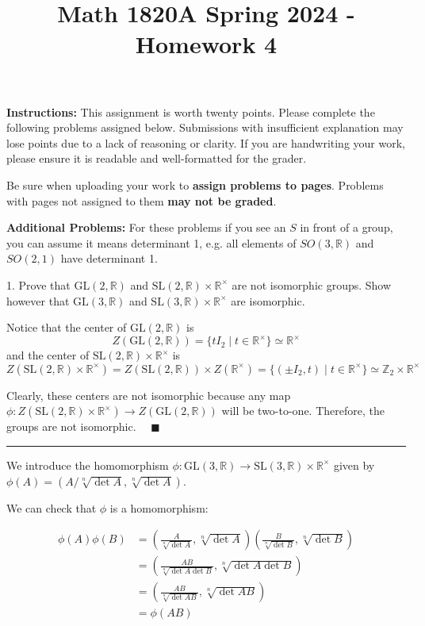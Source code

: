 \documentclass[12pt]{article}
\title{Math 1820A Spring 2024 - Homework 4}
\date{}
\newcommand{\Z}{\mathbb{Z}}
\newcommand{\R}{\mathbb{R}}
\newcommand{\GL}{\text{GL}}
\newcommand{\SL}{\text{SL}}
\newcommand{\qed}{\quad \blacksquare}
\begin{document}
\maketitle
\vspace{-0.5in}

\noindent \textbf{Instructions:}  This assignment is worth twenty points.  Please complete the following problems assigned below.  Submissions with insufficient explanation may lose points due to a lack of reasoning or clarity.  If you are handwriting your work, please ensure it is readable and well-formatted for the grader.

Be sure when uploading your work to \textbf{assign problems to pages}.  Problems with pages not assigned to them \textbf{may not be graded}.  


\textbf{Additional Problems:}   For these problems if you see an $S$ in front of a group, you can assume it means determinant 1, e.g. all elements of $SO(3,\R)$ and $SO(2,1)$ have determinant 1.


1.  Prove that $\GL(2,\R)$ and $\SL(2,\R)\times \R^{\times}$ are not isomorphic groups.  Show however that $\GL(3,\R)$ and $\SL(3,\R)\times \R^{\times}$ are isomorphic.  

    \color{blue}
        Notice that the center of $\GL(2,\R)$ is 
        \[Z(\GL(2, \R)) = \{tI_2 \; | \; t \in \R^{\times}\} \simeq \R^{\times}\] 
        and the center of $\SL(2, \R) \times \R^{\times}$ is 
        \[Z(\SL(2, \R) \times \R^{\times}) = Z(\SL(2, \R)) \times Z(\R^{\times}) = \{(\pm I_2, t) \; | \; t \in \R^{\times}\} \simeq \Z_2 \times \R^{\times}\]

        Clearly, these centers are not isomorphic because any map $\phi: Z(\SL(2, \R) \times \R^{\times}) \to Z(\GL(2, \R))$ will be two-to-one. Therefore, the groups are not isomorphic. $\qed$

        \vspace*{10pt}
        \hrule 
        \vspace*{10pt}

        We introduce the homomorphism $\phi: \GL(3, \R) \to \SL(3, \R) \times \R^{\times}$ given by $\phi(A) = (A/\sqrt[n]{\det A}, \sqrt[n]{\det A})$.

        We can check that $\phi$ is a homomorphism:

        \begin{align*}
            \phi(A)\phi(B) &= (\frac{A}{\sqrt[n]{\det A}}, \sqrt[n]{\det A})(\frac{B}{\sqrt[n]{\det B}}, \sqrt[n]{\det B})\\
                &= (\frac{AB}{\sqrt[n]{\det A \det B}}, \sqrt[n]{\det A \det B})\\ 
                &= (\frac{AB}{\sqrt[n]{\det AB}}, \sqrt[n]{\det AB})\\
                &= \phi(AB)
        \end{align*}
\end{document}
